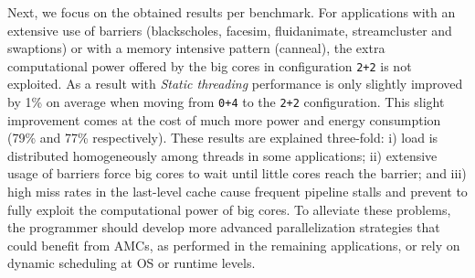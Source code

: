 

Next, we focus on the obtained results per benchmark. 
For applications with an extensive use of barriers (blackscholes, facesim, fluidanimate, streamcluster and swaptions) or with a memory intensive pattern (canneal), the extra computational power offered by the big cores in configuration \texttt{2+2} is not exploited. 
As a result with \emph{Static threading} performance is only slightly improved by 1\% on average when moving from \texttt{0+4} to the \texttt{2+2} configuration. 
This slight improvement comes at the cost of much more power and energy consumption (79\% and 77\% respectively).
These results are explained three-fold: i) load is distributed homogeneously among threads in some 
applications; ii) extensive usage of barriers force big cores to wait until little cores reach the 
barrier; and iii) high miss rates in the last-level cache cause frequent pipeline stalls and prevent 
to fully exploit the computational power of big cores. 
To alleviate these problems, the programmer should develop more advanced parallelization strategies that could benefit from AMCs, as performed in the remaining applications, or rely on dynamic scheduling at OS or runtime levels.

